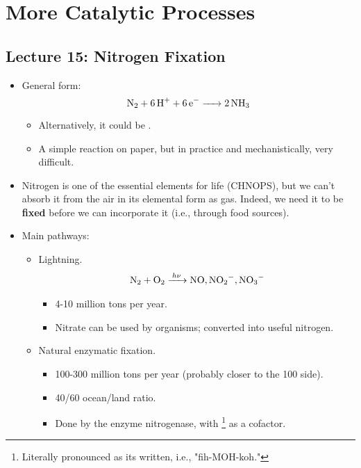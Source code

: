 \documentclass[../notes.tex]{subfiles}
\begin{document}
\chapter{More Catalytic Processes}
\section{Lecture 15: Nitrogen Fixation}
\begin{itemize}
    \item {}General form:
    \begin{equation*}
        \ce{N2 + 6H+ + 6e- -> 2NH3}
    \end{equation*}
    \begin{itemize}
        \item Alternatively, it could be .
        \item A simple reaction on paper, but in practice and mechanistically, very difficult.
    \end{itemize}
    \item Nitrogen is one of the essential elements for life (CHNOPS), but we can't absorb it from the air in its elemental form as  gas. Indeed, we need it to be \textbf{fixed} before we can incorporate it (i.e., through food sources).
    \item Main pathways:
    \begin{itemize}
        \item Lightning.
        \begin{align*}
            \ce{N2 + O2 ->[$h\nu$] NO, NO2^-, NO3-}
        \end{align*}
        \begin{itemize}
            \item 4-10 million tons per year.
            \item Nitrate can be used by organisms; converted into useful nitrogen.
        \end{itemize}
        \item Natural enzymatic fixation.
        \begin{itemize}
            \item 100-300 million tons per year (probably closer to the 100 side).
            \item 40/60 ocean/land ratio.
            \item Done by the enzyme nitrogenase, with \footnote{Literally pronounced as its written, i.e., "fih-MOH-koh."} as a cofactor.
        \end{itemize}

\end{itemize}
\end{itemize}
\end{document}
